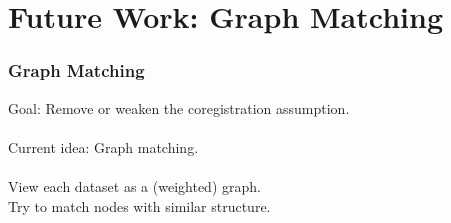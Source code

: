 \documentclass{beamer}
\begin{document}
\section{Future Work: Graph Matching}
\begin{frame}
  \frametitle{Graph Matching}
  Goal: Remove or weaken the coregistration assumption.\\~\\
  Current idea: Graph matching. \\~\\
  View each dataset as a (weighted) graph.\\
  Try to match nodes with similar structure.
\end{frame}


\end{document}
